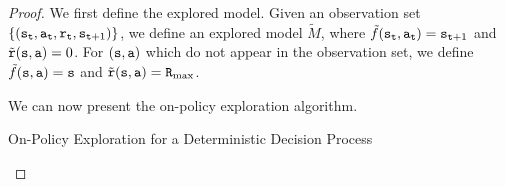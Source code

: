 \begin{proof}
We first define the explored model. Given an observation set
$\{({\tt s}_{\tt t},{\tt a}_{\tt t} ,{\tt r}_{\tt t},
{\tt s}_{{\tt t}+1})\}$, we define an explored model $\widetilde{M}$,
where $\tilde{f}({\tt s}_{\tt t},{\tt a}_{\tt t})={\tt s}_{{\tt t}+1}$
and $\tilde{{\tt r}}({\tt s},{\tt a})=0$.
%
For $({\tt s},{\tt a})$ which do not appear in the observation set,
we define $\tilde{f}({\tt s},{\tt a})={\tt s}$ and
$\tilde{{\tt r}}({\tt s},{\tt a})={\tt R}_{\max }$.


We can now present the on-policy exploration algorithm. 
\begin{algorithm}[H]
\caption{On-Policy Exploration for a Deterministic Decision Process}

\end{algorithm}
\end{proof}
